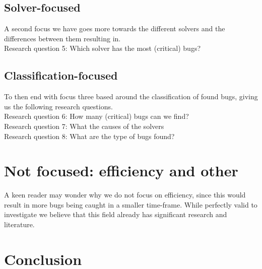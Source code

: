 \subsection{Solver-focused}
A second focus we have goes more towards the different solvers and the differences between them resulting in.
\\
Research question 5: Which solver has the most (critical) bugs?\\
\subsection{Classification-focused}
To then end with focus three based around the classification of found bugs, giving us the following research questions. 
\\
Research question 6: How many (critical) bugs can we find?\\
Research question 7: What the causes of the solvers\\
Research question 8: What are the type of bugs found?\\

\section{Not focused: efficiency and other} 
A keen reader may wonder why we do not focus on efficiency, since this would result in more bugs being caught in a smaller time-frame. While perfectly valid to investigate we believe that this field already has significant research and literature. 


\section{Conclusion}
\label{RQ:conclusion}

